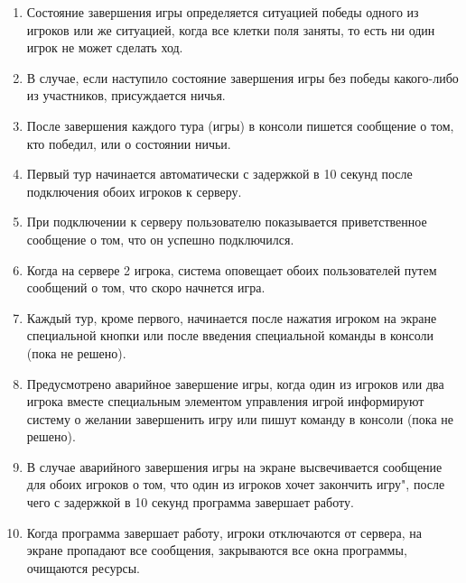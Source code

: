 \begin{enumerate}
	\item Состояние завершения игры определяется ситуацией победы одного из игроков или же ситуацией, когда все клетки поля заняты, то есть ни один игрок не может сделать ход.
	
	\item В случае, если наступило состояние завершения игры без победы какого-либо из участников, присуждается ничья.
	
	\item После завершения каждого тура (игры) в консоли пишется сообщение о том, кто победил, или о состоянии ничьи.
	
	\item Первый тур начинается автоматически с задержкой в 10 секунд после подключения обоих игроков к серверу.
	
	\item При подключении к серверу пользователю показывается приветственное сообщение о том, что он успешно подключился.
	
	\item Когда на сервере 2 игрока, система оповещает обоих пользователей путем сообщений о том, что скоро начнется игра.
	
	\item Каждый тур, кроме первого, начинается после нажатия игроком на экране специальной кнопки или после введения специальной команды в консоли (пока не решено).
	
	\item Предусмотрено аварийное завершение игры, когда один из игроков или два игрока вместе специальным элементом управления игрой информируют систему о желании завершенить игру или пишут команду в консоли (пока не решено).
	
	\item В случае аварийного завершения игры на экране высвечивается сообщение для обоих игроков о том, что один из игроков хочет закончить игру", после чего с задержкой в 10 секунд программа завершает работу.
	
	\item Когда программа завершает работу, игроки отключаются от сервера, на экране пропадают все сообщения, закрываются все окна программы, очищаются ресурсы.

\end{enumerate}